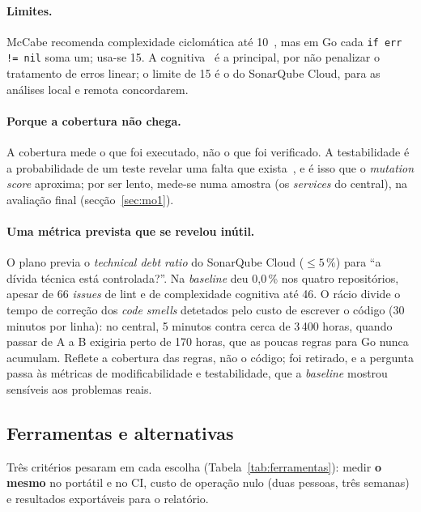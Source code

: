 \paragraph{Limites.}
McCabe recomenda complexidade ciclomática até 10~\cite{mccabe1976}, mas em Go cada \texttt{if err != nil} soma um;
usa-se 15. A cognitiva~\cite{campbell2018} é a principal, por não penalizar o tratamento de erros linear; o limite
de 15 é o do SonarQube Cloud, para as análises local e remota concordarem.

\paragraph{Porque a cobertura não chega.}
A cobertura mede o que foi executado, não o que foi verificado. A testabilidade é a probabilidade de um teste
revelar uma falta que exista~\cite{bastofernandes2026}, e é isso que o \emph{mutation score} aproxima; por ser lento,
mede-se numa amostra (os \emph{services} do central), na avaliação final (secção~\ref{sec:mo1}).

\paragraph{Uma métrica prevista que se revelou inútil.}
O plano previa o \emph{technical debt ratio} do SonarQube Cloud ($\le 5\,\%$) para ``a dívida técnica está
controlada?''. Na \emph{baseline} deu 0,0\,\% nos quatro repositórios, apesar de 66 \emph{issues} de lint e de complexidade
cognitiva até 46. O rácio divide o tempo de correção dos \emph{code smells} detetados pelo custo de escrever o código
(30 minutos por linha): no central, 5 minutos contra cerca de 3\,400 horas, quando passar de A a B exigiria perto de
170 horas, que as poucas regras para Go nunca acumulam. Reflete a cobertura das regras, não o código; foi retirado,
e a pergunta passa às métricas de modificabilidade e testabilidade, que a \emph{baseline} mostrou sensíveis aos problemas
reais.

\subsection{Ferramentas e alternativas}
\label{sec:ferramentas}

Três critérios pesaram em cada escolha (Tabela~\ref{tab:ferramentas}): medir \textbf{o mesmo} no portátil e no
CI, custo de operação nulo (duas pessoas, três semanas) e resultados exportáveis para o relatório.

